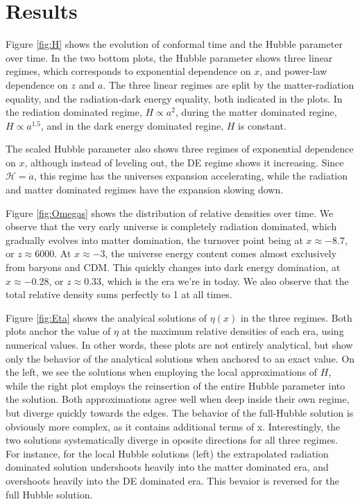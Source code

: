 \documentclass[10pt, a4paper]{article}
\begin{document}
\section{Results}
Figure \ref{fig:H} shows the evolution of conformal time and the Hubble parameter over time. In the two bottom plots, the Hubble parameter shows three linear regimes, which corresponds to exponential dependence on $x$, and power-law dependence on $z$ and $a$. The three linear regimes are split by the matter-radiation equality, and the radiation-dark energy equality, both indicated in the plots. In the rediation dominated regime, $H \propto a^2$, during the matter dominated regine, $H \propto a^{1.5}$, and in the dark energy dominated regine, $H$ is constant.

The scaled Hubble parameter also shows three regimes of exponential dependence on $x$, although instead of leveling out, the DE regime shows it increasing. Since $\mathcal{H} = \dot{a}$, this regime has the universes expansion accelerating, while the radiation and matter dominated regimes have the expansion slowing down.

Figure \ref{fig:Omegas} shows the distribution of relative densities over time. We observe that the very early universe is completely radiation dominated, which gradually evolves into matter domination, the turnover point being at $x\approx-8.7$, or $z\approx 6000$. At $x\approx-3$, the universe energy content comes almost exclusively from baryons and CDM. This quickly changes into dark energy domination, at $x\approx -0.28$, or $z\approx 0.33$, which is the era we're in today. We also observe that the total relative density sums perfectly to 1 at all times.

Figure \ref{fig:Eta} shows the analyical solutions of $\eta(x)$ in the three regimes. Both plots anchor the value of $\eta$ at the maximum relative densities of each era, using numerical values. In other words, these plots are not entirely analytical, but show only the behavior of the analytical solutions when anchored to an exact value. On the left, we see the solutions when employing the local approximations of $H$, while the right plot employs the reinsertion of the entire Hubble parameter into the solution. Both approximations agree well when deep inside their own regime, but diverge quickly towards the edges. The behavior of the full-Hubble solution is obviously more complex, as it contains additional terms of x. Interestingly, the two solutions systematically diverge in oposite directions for all three regimes. For instance, for the local Hubble solutions (left) the extrapolated radiation dominated solution undershoots heavily into the matter dominated era, and overshoots heavily into the DE dominated era. This bevaior is reversed for the full Hubble solution.
\end{document}
